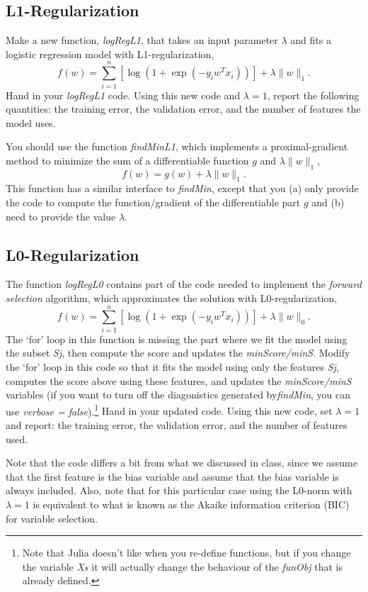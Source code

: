 \documentclass{article}
\def\blu#1{{\color{blu}#1}}
\def\norm#1{\|#1\|}
\begin{document}
\subsection{L1-Regularization}

Make a new function, \emph{logRegL1}, that takes an input parameter $\lambda$ and fits a logistic regression model with L1-regularization,
\[
f(w) = \sum_{i=1}^n \left[\log(1+\exp(-y_iw^Tx_i))\right] + \lambda\norm{w}_1.
\]
\blu{Hand in your \emph{logRegL1} code. Using this new code and $\lambda=1$, report the following quantities: the training error, the validation error, and the number of features the model uses.}


You should use the function \emph{findMinL1}, which implements a proximal-gradient method to minimize the sum of a differentiable function $g$ and $\lambda\norm{w}_1$,
\[
f(w) = g(w) + \lambda \norm{w}_1.
\]
 This function has a similar interface to \emph{findMin}, except that you (a) only provide the code to compute the function/gradient of the differentiable part $g$ and (b) need to provide the value $\lambda$. 


\subsection{L0-Regularization}

The function \emph{logRegL0} contains part of the code needed to implement the \emph{forward selection} algorithm, which approximates the solution with L0-regularization,
\[
f(w) =  \sum_{i=1}^n \left[\log(1+\exp(-y_iw^Tx_i))\right] + \lambda\norm{w}_0.
\]
The `for' loop in this function is missing the part where we fit the model using the subset \emph{Sj}, then compute the score and updates the \emph{minScore/minS}. Modify the `for' loop in this code so that it fits the model using only the features \emph{Sj}, computes the score above using these features, and updates the \emph{minScore/minS} variables (if you want to turn off the diagonistics generated by\emph{findMin}, you can use \emph{verbose = false}).\footnote{Note that Julia doesn't like when you re-define functions, but if you change the variable \emph{Xs} it will actually change the behaviour of the \emph{funObj} that is already defined.}
\blu{Hand in your updated code. Using this new code, set $\lambda = 1$ and report: the training error, the validation error, and the number of features used.}

Note that the code differs a bit from what we discussed in class, since we assume that the first feature is the bias variable and assume that the bias variable is always included. Also, note that for this particular case using the L0-norm with $\lambda=1$ is equivalent to what is known as the Akaike information criterion (BIC) for variable selection.
\end{document}
